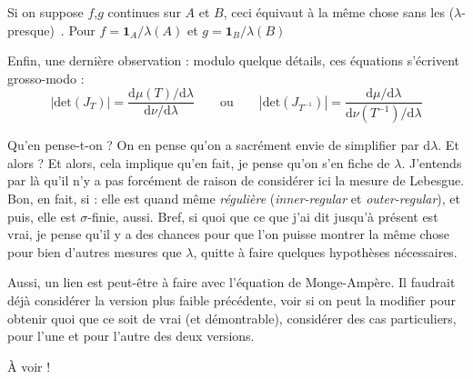 \documentclass[12pt]{article}
\begin{document}
Si on suppose $f$,$g$ continues sur $A$ et $B$, ceci équivaut à la même chose sans les \og ($\lambda$-presque) \fg\,. Pour $f = \mathbf 1_A / \lambda(A) $ et $ g = \mathbf 1_B / \lambda(B) $

Enfin, une dernière observation : modulo quelque détails, ces équations s'écrivent grosso-modo : $$ \left|\mathrm{det} (J_{T}) \right| = \frac{\displaystyle \mathrm d \mu(T) / \mathrm d \lambda}{\mathrm d \nu / \mathrm d \lambda} \qquad \text{ou} \qquad \left|\mathrm{det} (J_{T^{-1}}) \right| = \frac{\mathrm d \mu / \mathrm d \lambda}{\mathrm d \nu(T^{-1})/\mathrm d \lambda} $$

Qu'en pense-t-on ? On en pense qu'on a sacrément envie de simplifier par $ \mathrm d \lambda $. Et alors ? Et alors, cela implique qu'en fait, je pense qu'on s'en fiche de $\lambda$. J'entends par là qu'il n'y a pas forcément de raison de considérer ici la mesure de Lebesgue. Bon, en fait, si : elle est quand même \textit{régulière} (\textit{inner-regular} et \textit{outer-regular}), et puis, elle est $ \sigma$-finie, aussi. Bref, si quoi que ce que j'ai dit jusqu'à présent est vrai, je pense qu'il y a des chances pour que l'on puisse montrer la même chose pour bien d'autres mesures que $ \lambda $, quitte à faire quelques hypothèses nécessaires.

Aussi, un lien est peut-être à faire avec l'équation de Monge-Ampère. Il faudrait déjà considérer la version plus faible précédente, voir si on peut la modifier pour obtenir quoi que ce soit de vrai (et démontrable), considérer des cas particuliers, pour l'une et pour l'autre des deux versions. 

À voir ! 




\newpage 

\

\newpage




\end{document}
